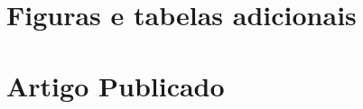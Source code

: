 \documentclass[
	12pt,				%
	oneside,
	a4paper,			%
	english,			%
	spanish,			%
	brazil				%
	]{abntex2}
\begin{document}

\begin{apendicesenv}

\partapendices

\chapter{Figuras e tabelas adicionais}

%


\chapter{Artigo Publicado}

%

\end{apendicesenv}











\printindex
\end{document}
